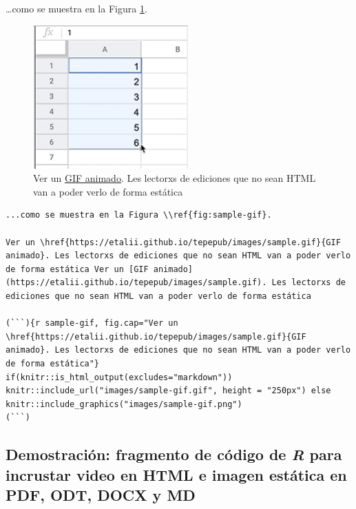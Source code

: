 \documentclass[
]{book}
\begin{document}
\ldots como se muestra en la Figura \ref{fig:sample-gif}.



\begin{figure}
\centering
\includegraphics{images/sample-gif.pdf}
\caption{\label{fig:sample-gif}Ver un \href{https://etalii.github.io/tepepub/images/sample.gif}{GIF animado}. Les lectorxs de ediciones que no sean HTML van a poder verlo de forma estática}
\end{figure}

\begin{verbatim}
...como se muestra en la Figura \\ref{fig:sample-gif}.

Ver un \href{https://etalii.github.io/tepepub/images/sample.gif}{GIF animado}. Les lectorxs de ediciones que no sean HTML van a poder verlo de forma estática Ver un [GIF animado](https://etalii.github.io/tepepub/images/sample.gif). Les lectorxs de ediciones que no sean HTML van a poder verlo de forma estática

(```){r sample-gif, fig.cap="Ver un \href{https://etalii.github.io/tepepub/images/sample.gif}{GIF animado}. Les lectorxs de ediciones que no sean HTML van a poder verlo de forma estática"}
if(knitr::is_html_output(excludes="markdown")) knitr::include_url("images/sample-gif.gif", height = "250px") else knitr::include_graphics("images/sample-gif.png")
(```)
\end{verbatim}

\hypertarget{demostraciuxf3n-fragmento-de-cuxf3digo-de-r-para-incrustar-video-en-html-e-imagen-estuxe1tica-en-pdf-odt-docx-y-md}{%
\subsection{\texorpdfstring{Demostración: fragmento de código de \emph{R} para incrustar video en HTML e imagen estática en PDF, ODT, DOCX y MD}{Demostración: fragmento de código de R para incrustar video en HTML e imagen estática en PDF, ODT, DOCX y MD}}\label{demostraciuxf3n-fragmento-de-cuxf3digo-de-r-para-incrustar-video-en-html-e-imagen-estuxe1tica-en-pdf-odt-docx-y-md}}
\end{document}
